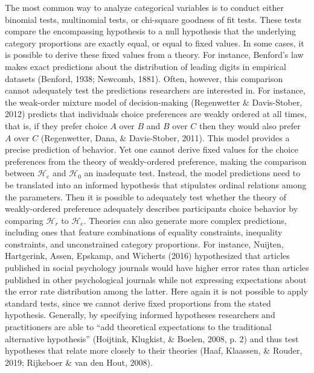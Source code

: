 \documentclass[
  english,
  man,floatsintext]{apa6}
\begin{document}
The most common way to analyze categorical variables is to conduct either binomial tests, multinomial tests, or chi-square goodness of fit tests. These tests compare the encompassing hypothesis to a null hypothesis that the underlying category proportions are exactly equal, or equal to fixed values. In some cases, it is possible to derive these fixed values from a theory. For instance, Benford's law makes exact predictions about the distribution of leading digits in empirical datasets (Benford, 1938; Newcomb, 1881). Often, however, this comparison cannot adequately test the predictions researchers are interested in. For instance, the weak-order mixture model of decision-making (Regenwetter \& Davis-Stober, 2012) predicts that individuals choice preferences are weakly ordered at all times, that is, if they prefer choice \(A\) over \(B\) and \(B\) over \(C\) then they would also prefer \(A\) over \(C\) (Regenwetter, Dana, \& Davis-Stober, 2011). This model provides a precise prediction of behavior. Yet one cannot derive fixed values for the choice preferences from the theory of weakly-ordered preference, making the comparison between \(\mathcal{H}_e\) and \(\mathcal{H}_0\) an inadequate test. Instead, the model predictions need to be translated into an informed hypothesis that stipulates ordinal relations among the parameters. Then it is possible to adequately test whether the theory of weakly-ordered preference adequately describes participants choice behavior by comparing \(\mathcal{H}_r\) to \(\mathcal{H}_e\). Theories can also generate more complex predictions, including ones that feature combinations of equality constraints, inequality constraints, and unconstrained category proportions. For instance, Nuijten, Hartgerink, Assen, Epskamp, and Wicherts (2016) hypothesized that articles published in social psychology journals would have higher error rates than articles published in other psychological journals while not expressing expectations about the error rate distribution among the latter. Here again it is not possible to apply standard tests, since we cannot derive fixed proportions from the stated hypothesis. Generally, by specifying informed hypotheses researchers and practitioners are able to ``add theoretical expectations to the traditional alternative hypothesis'' (Hoijtink, Klugkist, \& Boelen, 2008, p. 2) and thus test hypotheses that relate more closely to their theories (Haaf, Klaassen, \& Rouder, 2019; Rijkeboer \& van den Hout, 2008).
\end{document}
